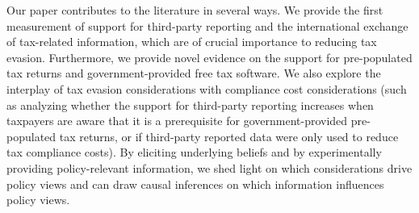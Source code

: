 \documentclass[12pt]{article}
\begin{document}

Our paper contributes to the literature in several ways. We provide the first measurement of support for third-party reporting and the international exchange of tax-related information, which are of crucial importance to reducing tax evasion. Furthermore, we provide novel evidence on the support for pre-populated tax returns and government-provided free tax software. We also explore the interplay of tax evasion considerations with compliance cost considerations (such as analyzing whether the support for third-party reporting increases when taxpayers are aware that it is a prerequisite for government-provided pre-populated tax returns, or if third-party reported data were only used to reduce tax compliance costs). By eliciting underlying beliefs and by experimentally providing policy-relevant information, we shed light on which considerations drive policy views and can draw causal inferences on which information influences policy views.





\newpage
\printbibliography
\end{document}
